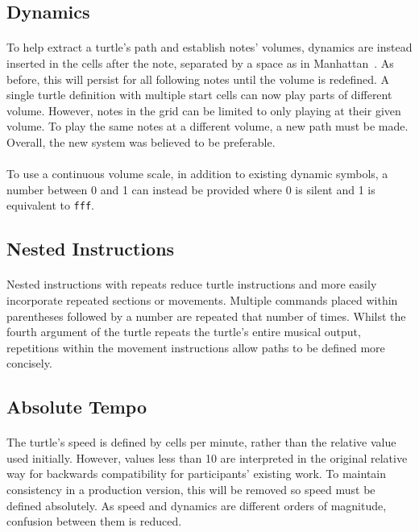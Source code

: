 \subsection{Dynamics}

\paragraph{} To help extract a turtle's path and establish notes' volumes, dynamics are instead inserted in the cells after the note, separated by a space as in Manhattan~\cite{nash:manhattan}. As before, this will persist for all following notes until the volume is redefined. A single turtle definition with multiple start cells can now play parts of different volume. However, notes in the grid can be limited to only playing at their given volume. To play the same notes at a different volume, a new path must be made. Overall, the new system was believed to be preferable.

\paragraph{} To use a continuous volume scale, in addition to existing dynamic symbols, a number between 0 and 1 can instead be provided where 0 is silent and 1 is equivalent to \texttt{fff}.

\subsection{Nested Instructions}

\paragraph{} Nested instructions with repeats reduce turtle instructions and more easily incorporate repeated sections or movements. Multiple commands placed within parentheses followed by a number are repeated that number of times. Whilst the fourth argument of the turtle repeats the turtle's entire musical output, repetitions within the movement instructions allow paths to be defined more concisely.

\subsection{Absolute Tempo}

\paragraph{} The turtle's speed is defined by cells per minute, rather than the relative value used initially. However, values less than 10 are interpreted in the original relative way for backwards compatibility for participants' existing work. To maintain consistency in a production version, this will be removed so speed must be defined absolutely. As speed and dynamics are different orders of magnitude, confusion between them is reduced.

